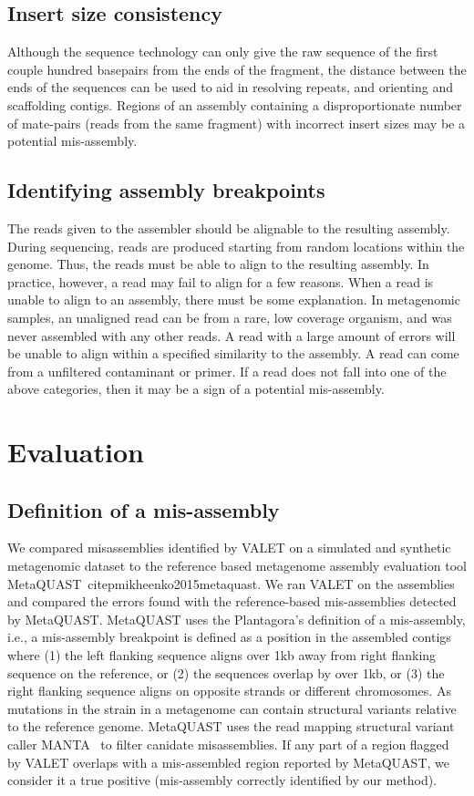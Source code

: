 \documentclass{article}
\begin{document}
\subsection{Insert size consistency}
Although the sequence technology can only give the raw sequence of the first couple hundred basepairs from the ends of the fragment, the distance between the ends of the sequences can be used to aid in resolving repeats, and orienting and scaffolding contigs. 
Regions of an assembly containing a disproportionate number of mate-pairs (reads from the same fragment) with incorrect insert sizes may be a potential mis-assembly.

\subsection{Identifying assembly breakpoints}
The reads given to the assembler should be alignable to the resulting assembly.
During sequencing, reads are produced starting from random locations within the genome.
Thus, the reads must be able to align to the resulting assembly.
In practice, however, a read may fail to align for a few reasons.
When a read is unable to align to an assembly, there must be some explanation.
In metagenomic samples, an unaligned read can be from a rare, low coverage organism, and was never assembled with any other reads.
A read with a large amount of errors will be unable to align within a specified similarity to the assembly.
A read can come from a unfiltered contaminant or primer.
If a read does not fall into one of the above categories, then it may be a sign of a potential mis-assembly.

\section{Evaluation}
\subsection{Definition of a mis-assembly}
We compared misassemblies identified by VALET on a simulated and synthetic metagenomic dataset to the reference based metagenome assembly evaluation tool MetaQUAST~citep{mikheenko2015metaquast}.
We ran VALET on the assemblies and compared the errors found with the reference-based mis-assemblies detected by MetaQUAST.
MetaQUAST uses the Plantagora’s definition of a mis-assembly,
i.e., a mis-assembly breakpoint is defined as a position in the assembled contigs where (1) the left flanking
sequence aligns over 1kb away from right flanking sequence on the reference, or (2) the sequences overlap by
over 1kb, or (3) the right flanking sequence aligns on opposite strands or different chromosomes. 
As mutations in the strain in a metagenome can contain structural variants relative to the reference genome. 
MetaQUAST uses the read mapping structural variant caller MANTA~\citep{chen2015manta} to filter canidate misassemblies. 
If any part of a region flagged by VALET overlaps with a mis-assembled region reported by MetaQUAST, we consider it a true positive (mis-assembly correctly identified by our method).
\end{document}
